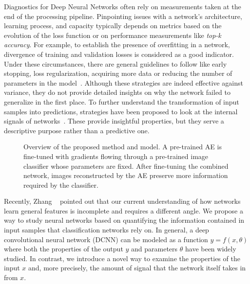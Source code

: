 \documentclass[10pt,twocolumn,a4paper]{article}
\begin{document}
Diagnostics for Deep Neural Networks often rely on measurements taken at the end of the processing pipeline.
Pinpointing issues with a network's architecture, learning process, and capacity typically depends on metrics based on the evolution of the loss function or on performance measurements like \textit{top-k accuracy}.
For example, to establish the presence of overfitting in a network, divergence of training and validation losses is considered as a good indicator.
Under these circumstances, there are general guidelines to follow like early stopping, loss regularization, acquiring more data or reducing the number of parameters in the model~\cite{bengio2012practical}.
Although these strategies are indeed effective against variance, they do not provide detailed insights on why the network failed to generalize in the first place.
To further understand the transformation of input samples into predictions, strategies have been proposed to look at the internal signals of networks~\cite{zeiler2014visualizing, simonyan2013deep}.
These provide insightful properties, but they serve a descriptive purpose rather than a predictive one.

\begin{figure}
	\footnotesize
	
	\caption{Overview of the proposed method and model. A pre-trained AE is fine-tuned with gradients flowing through a pre-trained image classifier whose parameters are fixed. After fine-tuning the combined network, images reconstructed by the AE preserve more information required by the classifier.}
	\label{fig:overview}
\end{figure}

Recently, Zhang \etal~\cite{zhang2016understanding} pointed out that our current understanding of how networks learn general features is incomplete and requires a different angle.
We propose a way to study neural networks based on quantifying the information contained in input samples that classification networks rely on.
In general, a deep convolutional neural network (DCNN) can be modeled as a function $y = f(x, \theta)$ where both the properties of the output $y$ and parameters $\theta$ have been widely studied.
In contrast, we introduce a novel way to examine the properties of the input $x$ and, more precisely, the amount of signal that the network itself takes in from $x$.
\end{document}
